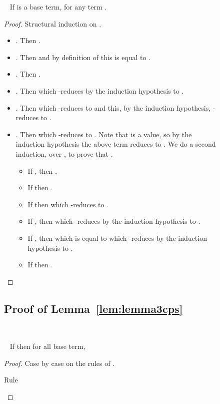 \documentclass{LMCS}
\newcommand{\recap}[2]{\medskip\noindent{\bf #1 \ref{#2}.}~}
\begin{document}
\begin{figure}
{\recap{Lemma}{lem:lemma2cps}
If  is a base term,  for any term 
.
\begin{proof}
  Structural induction on .
  \begin{itemize}
    \item . Then .
    \item . Then  and by definition of  this is equal to .
    \item . Then .
    \item . Then   which -reduces by the induction hypothesis to .
    \item . Then  which -reduces to  and this, by the induction hypothesis, -reduces to . 
    \item . Then  which -reduces to . Note that  is a value, so by the induction hypothesis the above term reduces to . 
      We do a second induction, over , to prove that .
      \begin{itemize} 
	\item If , then .
	\item If  then .
	\item If  then  which -reduces to .
	\item If , then   which -reduces by the induction hypothesis to .
	\item If , then  which is equal to  which -reduces by the induction hypothesis to .
	\item If  then .\qedhere
      \end{itemize}
  \end{itemize}
\end{proof}

\subsection{Proof of Lemma~\ref{lem:lemma3cps}}\label{proof:lemma3cps}~

\recap{Lemma}{lem:lemma3cps}
If  then for all  base term, 
\begin{proof}
  Case by case on the rules of .
  \begin{description}
    \item[Rule ]
      

\end{description}
\end{proof}}
\end{figure}
\end{document}
